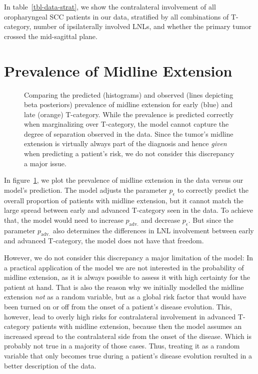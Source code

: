 \documentclass[
  sn-mathphys-num,
]{sn-jnl}
\begin{document}
In table~\ref{tbl-data-strat}, we show the contralateral involvement of all oropharyngeal SCC patients in our data, stratified by all combinations of T-category, number of ipsilaterally involved LNLs, and whether the primary tumor crossed the mid-sagittal plane.

\section{Prevalence of Midline Extension}\label{sec-prevalence-midext}

\begin{figure}

\centering{



}

\caption{\label{fig-model-prevalences-midext}Comparing the predicted
(histograms) and observed (lines depicting beta posteriors) prevalence
of midline extension for early (blue) and late (orange) T-category.
While the prevalence is predicted correctly when marginalizing over
T-category, the model cannot capture the degree of separation observed
in the data. Since the tumor's midline extension is virtually always
part of the diagnosis and hence \emph{given} when predicting a patient's
risk, we do not consider this discrepancy a major issue.}

\end{figure}%

In figure~\ref{fig-model-prevalences-midext}, we plot the prevalence of
midline extension in the data versus our model's prediction. The model
adjusts the parameter \(p_\epsilon\) to correctly predict the overall
proportion of patients with midline extension, but it cannot match the
large spread between early and advanced T-category seen in the data. To
achieve that, the model would need to increase \(p_\text{adv.}\) and
decrease \(p_\epsilon\). But since the parameter \(p_\text{adv.}\) also
determines the differences in LNL involvement between early and advanced
T-category, the model does not have that freedom.

However, we do not consider this discrepancy a major limitation of the
model: In a practical application of the model we are not interested in
the probability of midline extension, as it is always possible to assess
it with high certainty for the patient at hand. That is also the reason
why we initially modelled the midline extension \emph{not} as a random
variable, but as a global risk factor that would have been turned on or
off from the onset of a patient's disease evolution. This, however, lead
to overly high risks for contralateral involvement in advanced
T-category patients with midline extension, because then the model
assumes an increased spread to the contralateral side from the onset of
the disease. Which is probably not true in a majority of those cases.
Thus, treating it as a random variable that only becomes true during a
patient's disease evolution resulted in a better description of the
data.
\end{document}
